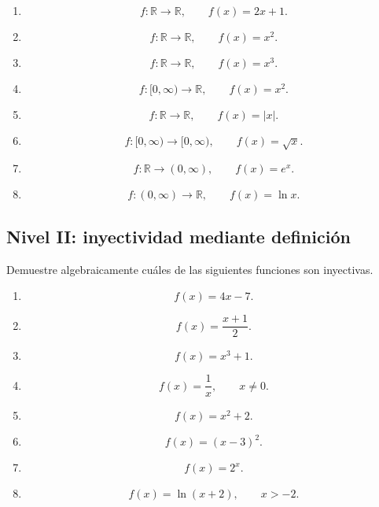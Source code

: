 \documentclass[12pt]{article}
\theoremstyle{remark}
\begin{document}
\begin{enumerate}
    \item
    \[
    f:\mathbb{R}\to\mathbb{R},
    \qquad f(x)=2x+1.
    \]

    \item
    \[
    f:\mathbb{R}\to\mathbb{R},
    \qquad f(x)=x^2.
    \]

    \item
    \[
    f:\mathbb{R}\to\mathbb{R},
    \qquad f(x)=x^3.
    \]

    \item
    \[
    f:[0,\infty)\to\mathbb{R},
    \qquad f(x)=x^2.
    \]

    \item
    \[
    f:\mathbb{R}\to\mathbb{R},
    \qquad f(x)=|x|.
    \]

    \item
    \[
    f:[0,\infty)\to[0,\infty),
    \qquad f(x)=\sqrt{x}.
    \]

    \item
    \[
    f:\mathbb{R}\to(0,\infty),
    \qquad f(x)=e^x.
    \]

    \item
    \[
    f:(0,\infty)\to\mathbb{R},
    \qquad f(x)=\ln x.
    \]
\end{enumerate}

\subsection{Nivel II: inyectividad mediante definición}

Demuestre algebraicamente cuáles de las siguientes funciones son
inyectivas.

\begin{enumerate}
    \item
    \[
    f(x)=4x-7.
    \]

    \item
    \[
    f(x)=\frac{x+1}{2}.
    \]

    \item
    \[
    f(x)=x^3+1.
    \]

    \item
    \[
    f(x)=\frac{1}{x},
    \qquad x\neq0.
    \]

    \item
    \[
    f(x)=x^2+2.
    \]

    \item
    \[
    f(x)=(x-3)^2.
    \]

    \item
    \[
    f(x)=2^x.
    \]

    \item
    \[
    f(x)=\ln(x+2),
    \qquad x>-2.
    \]
\end{enumerate}
\end{document}
